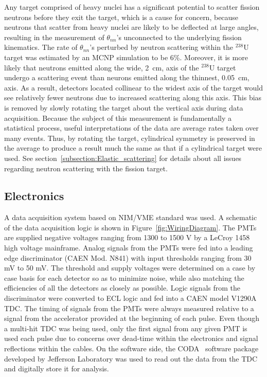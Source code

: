 \documentclass[%
 reprint,
 amsmath,amssymb,
 aps,
 nofootinbib
]{revtex4-1}
\begin{document}
Any target comprised of heavy nuclei has a significant potential to scatter fission neutrons before they exit the target, which is a cause for concern, because neutrons that scatter from heavy nuclei are likely to be deflected at large angles, resulting in the measurement of $\theta_{nn}$'s unconnected to the underlying fission kinematics.
The rate of $\theta_{nn}$'s perturbed by neutron scattering within the $^{238}$U target was estimated by an MCNP simulation to be 6\%.
Moreover, it is more likely that neutrons emitted along the wide, 2~cm, axis of the $^{238}$U target undergo a scattering event than neurons emitted along the thinnest, 0.05~cm, axis.
As a result, detectors located collinear to the widest axis of the target would see relatively fewer neutrons due to increased scattering along this axis. 
This bias is removed by slowly rotating the target about the vertical axis during data acquisition.
Because the subject of this measurement is fundamentally a statistical process, useful interpretations of the data are average rates taken over many events.
Thus, by rotating the target, cylindrical symmetry is preserved in the average to produce a result much the same as that if a cylindrical target were used.
See section~\ref{subsection:Elastic_scattering} for details about all issues regarding neutron scattering with the fission target.  

\subsection{Electronics}
A data acquisition system based on NIM/VME standard was used.
A schematic of the data acquisition logic is shown in Figure~\ref{fig:WiringDiagram}.
The PMTs are supplied negative voltages ranging from 1300 to 1500 V by a LeCroy 1458 high voltage mainframe.
Analog signals from the PMTs were fed into a leading edge discriminator (CAEN Mod. N841) with input thresholds ranging from 30 mV to 50 mV.
The threshold and supply voltages were determined on a case by case basis for each detector so as to minimize noise, while also matching the efficiencies of all the detectors as closely as possible.
Logic signals from the discriminator were converted to ECL logic and fed into a CAEN model V1290A TDC.
The timing of signals from the PMTs were always measured relative to a signal from the accelerator provided at the beginning of each pulse.
Even though a multi-hit TDC was being used, only the first signal from any given PMT is used each pulse due to concerns over dead-time within the electronics and signal reflections within the cables.
On the software side, the CODA~\cite{CODA} software package developed by Jefferson Laboratory was used to read out the data from the TDC and digitally store it for analysis.
\end{document}
